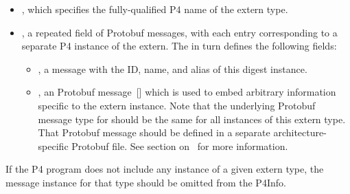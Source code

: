 \documentclass[11pt]{article}
\begin{document}
{\begin{itemize}
\item{}
, which specifies the fully-qualified P4 name of the extern
type.%

\item{}
, a repeated field of  Protobuf messages, with each
entry corresponding to a separate P4 instance of the extern. The
 in turn defines the following fields:%

\begin{itemize}[noitemsep,topsep=\mdcompacttopsep]%

\item{}, a  message with the ID, name, and alias of this digest
instance.%

\item{}, an  Protobuf message~[] which is used to embed
arbitrary information specific to the extern instance. Note that the
underlying Protobuf message type for  should be the same for all
instances of this extern type. That Protobuf message should be defined in a
separate architecture-specific Protobuf file. See section on~ for more
information.%
\end{itemize}%
\end{itemize}%

\noindent{}If the P4 program does not include any instance of a given extern type, the
 message instance for that type should be omitted from the P4Info.%

}
\end{document}
